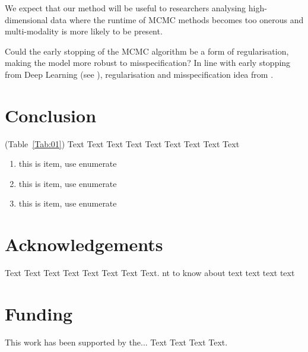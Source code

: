 \documentclass{bioinfo}
\begin{document}
We expect that our method will be useful to researchers analysing high-dimensional data where the runtime of MCMC methods becomes too onerous and multi-modality is more likely to be present.

Could the early stopping of the MCMC algorithm be a form of regularisation, making the model more robust to misspecification? In line with early stopping from Deep Learning (see \citealp{morgan1990generalization}), regularisation and misspecification idea from \cite{miller2018robust, cai2020finite}.


%
%






\section{Conclusion}

(Table~\ref{Tab:01}) Text Text Text Text Text Text  Text Text Text

\begin{enumerate}
\item this is item, use enumerate
\item this is item, use enumerate
\item this is item, use enumerate
\end{enumerate}




\section*{Acknowledgements}

Text Text Text Text Text Text  Text Text. nt to know about  text
text text text\vspace*{-12pt}

\section*{Funding}

This work has been supported by the... Text Text  Text Text.\vspace*{-12pt}


%
%
%
%
%
%
%
%
  
\end{document}
